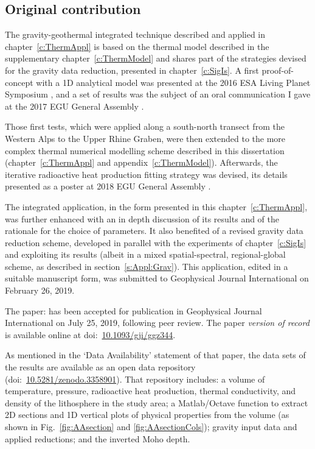 \subsection*{Original contribution}
The gravity-geothermal integrated technique described and applied in chapter~\ref{c:ThermAppl} is based on the thermal model described in the supplementary chapter~\ref{c:ThermModel} and shares part of the strategies devised for the gravity data reduction, presented in chapter~\ref{c:SigIs}.
A first proof-of-concept with a 1D analytical model was presented at the 2016 ESA Living Planet Symposium \parencite{Pastorutti2016LPS}, and a set of results was the subject of an oral communication I gave at the 2017 EGU General Assembly \parencite{Pastorutti2017_EGUoral}.

Those first tests, which were applied along a south-north transect from the Western Alps to the Upper Rhine Graben, were then extended to the more complex thermal numerical modelling scheme described in this dissertation (chapter~\ref{c:ThermAppl} and appendix~\ref{c:ThermModel}).
Afterwards, the iterative radioactive heat production fitting strategy was devised, its details presented as a poster at 2018 EGU General Assembly \parencite{Pastorutti2018_EGUposter}.

The integrated application, in the form presented in this chapter~\ref{c:ThermAppl}, was further enhanced with an in depth discussion of its results and of the rationale for the choice of parameters.
It also benefited of a revised gravity data reduction scheme, developed in parallel with the experiments of chapter~\ref{c:SigIs} and exploiting its results (albeit in a mixed spatial-spectral, regional-global scheme, as described in section~\ref{s:Appl:Grav}).
This application, edited in a suitable manuscript form, was submitted to Geophysical Journal International on February 26, 2019.

The paper:  \parencite{Pastorutti2019} has been accepted for publication in Geophysical Journal International on July 25, 2019, following peer review.
The paper \textit{version of record} is available online at doi:~\href{https://doi.org/10.1093/gji/ggz344}{10.1093/gji/ggz344}.

As mentioned in the `Data Availability' statement of that paper, the data sets of the results are available as an open data repository (doi:~\href{https://doi.org/10.5281/zenodo.3358901}{10.5281/zenodo.3358901}).
That repository includes: a volume of temperature, pressure, radioactive heat production, thermal conductivity, and density of the lithosphere in the study area; a Matlab/Octave function to extract 2D sections and 1D vertical plots of physical properties from the volume (as shown in Fig.~\ref{fig:AAsection} and \ref{fig:AAsectionCols}); gravity input data and applied reductions; and the inverted Moho depth.

